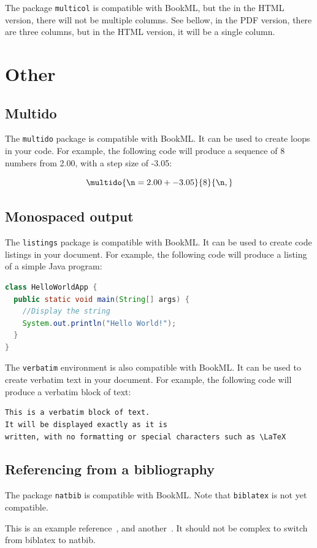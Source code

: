 The package \verb|multicol| is compatible with BookML, but the in the HTML version, there will not be multiple columns. See bellow, in the PDF version, there are three columns, but in the HTML version, it will be a single column.
\begin{multicols}{3}
     \lipsum[1-2]
\end{multicols}

\section{Other}
\subsection{Multido}
\label{demo:multido}
The \verb|multido| package is compatible with BookML. It can be used to create loops in your code. For example, the following code will produce a sequence of 8 numbers from 2.00, with a step size of -3.05:

$$
\multido{\n=2.00+-3.05}{8}{\n, }
$$

\subsection{Monospaced output}
\label{demo:code}
The \verb|listings| package is compatible with BookML. It can be used to create code listings in your document. For example, the following code will produce a listing of a simple Java program:


\begin{lstlisting}[language=Java]
class HelloWorldApp {
  public static void main(String[] args) {
    //Display the string
    System.out.println("Hello World!");
  }
}
\end{lstlisting}
The \verb|verbatim| environment is also compatible with BookML. It can be used to create verbatim text in your document. For example, the following code will produce a verbatim block of text:
\begin{verbatim}
This is a verbatim block of text.
It will be displayed exactly as it is 
written, with no formatting or special characters such as \LaTeX
\end{verbatim}

\subsection{Referencing from a bibliography}
\label{bib}

The package \verb|natbib| is compatible with BookML. Note that \verb|biblatex| is not yet compatible.

This is an example reference~\cite{strikwerda2004}, and another~\citep{parret2016time}. It should not be complex to switch from biblatex to natbib. 


